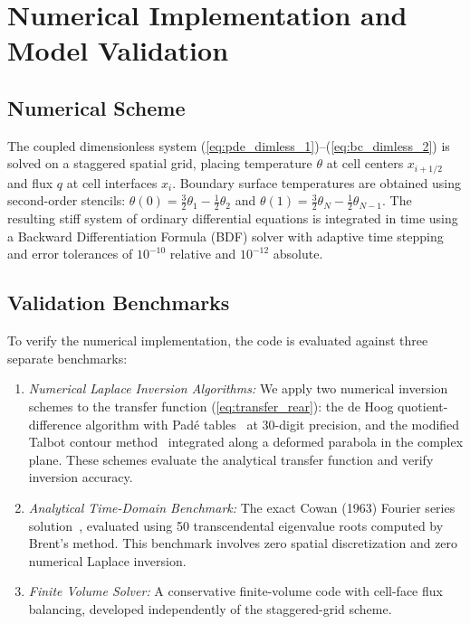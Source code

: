 \documentclass[preprint,12pt]{elsarticle}
\begin{document}
\section{Numerical Implementation and Model Validation}

\subsection{Numerical Scheme}

The coupled dimensionless system (\ref{eq:pde_dimless_1})--(\ref{eq:bc_dimless_2}) is solved on a staggered spatial grid, placing temperature $\theta$ at cell centers $x_{i+1/2}$ and flux $q$ at cell interfaces $x_i$. Boundary surface temperatures are obtained using second-order stencils: $\theta(0) = \frac{3}{2}\theta_1 - \frac{1}{2}\theta_2$ and $\theta(1) = \frac{3}{2}\theta_N - \frac{1}{2}\theta_{N-1}$. The resulting stiff system of ordinary differential equations is integrated in time using a Backward Differentiation Formula (BDF) solver with adaptive time stepping and error tolerances of $10^{-10}$ relative and $10^{-12}$ absolute.

\subsection{Validation Benchmarks}

To verify the numerical implementation, the code is evaluated against three separate benchmarks:
\begin{enumerate}
    \item \textit{Numerical Laplace Inversion Algorithms:}
    We apply two numerical inversion schemes to the transfer function (\ref{eq:transfer_rear}): the de Hoog quotient-difference algorithm with Padé tables~\cite{dehoog1982improved} at 30-digit precision, and the modified Talbot contour method~\cite{talbot1979accurate} integrated along a deformed parabola in the complex plane. These schemes evaluate the analytical transfer function and verify inversion accuracy.
    \item \textit{Analytical Time-Domain Benchmark:}
    The exact Cowan (1963) Fourier series solution~\cite{cowan1963pulse}, evaluated using 50 transcendental eigenvalue roots computed by Brent's method. This benchmark involves zero spatial discretization and zero numerical Laplace inversion.
    \item \textit{Finite Volume Solver:} A conservative finite-volume code with cell-face flux balancing, developed independently of the staggered-grid scheme.
\end{enumerate}
\end{document}
